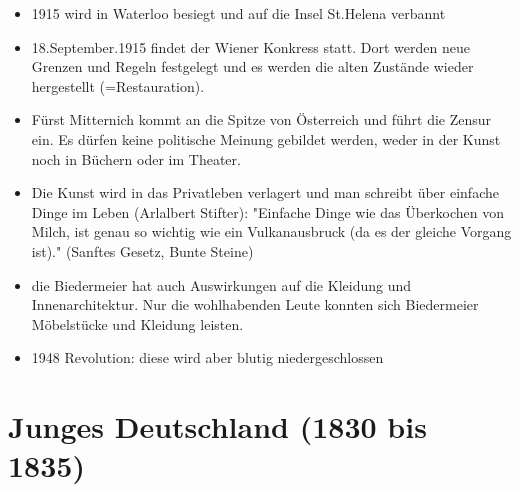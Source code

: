 \documentclass[12pt,a4paper]{article}
\begin{document}
	\begin{itemize}
	\item 1915 wird in Waterloo besiegt und auf die Insel St.Helena verbannt
	\item 18.September.1915 findet der Wiener Konkress statt. Dort werden neue Grenzen und Regeln festgelegt und es werden die alten Zustände
	wieder hergestellt (=Restauration).
	\item Fürst Mitternich kommt an die Spitze von Österreich und führt die Zensur ein. Es dürfen keine politische Meinung gebildet werden, weder in der Kunst noch in Büchern oder im Theater.
	\item Die Kunst wird in das Privatleben verlagert und man schreibt über einfache Dinge im Leben (Arlalbert Stifter): "Einfache Dinge wie das Überkochen von Milch, ist genau so wichtig wie ein Vulkanausbruck (da es der gleiche Vorgang ist)." (Sanftes Gesetz, Bunte Steine)
	\item die Biedermeier hat auch Auswirkungen auf die Kleidung und Innenarchitektur. Nur die wohlhabenden Leute konnten sich Biedermeier Möbelstücke und Kleidung leisten.
	\item 1948 Revolution: diese wird aber blutig niedergeschlossen	
	
	\end{itemize}
	
\newpage	
	
\section{Junges Deutschland (1830 bis 1835)}
\end{document}
